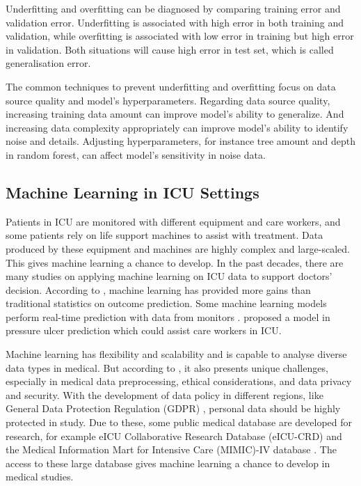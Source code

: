 \documentclass[12pt,a4paper,english
]{tunithesis}
\begin{document}
Underfitting and overfitting can be diagnosed by comparing training error and validation error. Underfitting is associated with high error in both training and validation, while overfitting is associated with low error in training but high error in validation. Both situations will cause high error in test set, which is called generalisation error. 

The common techniques to prevent underfitting and overfitting focus on data source quality and model's hyperparameters. Regarding data source quality, increasing training data amount can improve model's ability to generalize. And increasing data complexity appropriately can improve model's ability to identify noise and details. Adjusting hyperparameters, for instance tree amount and depth in random forest, can affect model's sensitivity in noise data. 

\subsection{Machine Learning in ICU Settings}
Patients in ICU are monitored with different equipment and care workers, and some patients rely on life support machines to assist with treatment. Data produced by these equipment and machines are highly complex and large-scaled. This gives machine learning a chance to develop. In the past decades, there are many studies on applying machine learning on ICU data to support doctors' decision. According to \textcite{Kim2011}, machine learning has provided more gains than traditional statistics on outcome prediction. Some machine learning models perform real-time prediction with data from monitors \parencite{mitdavid2020, Zhale2021}. \textcite{sin2022} proposed a model in pressure ulcer prediction which could assist care workers in ICU. 

Machine learning has flexibility and scalability and is capable to analyse diverse data types in medical. But according to \textcite{ngiam2019}, it also presents unique challenges, especially in medical data preprocessing, ethical considerations, and data privacy and security. With the development of data policy in different regions, like General Data Protection Regulation (GDPR) \parencite{GDPR2016}, personal data should be highly protected in study. Due to these, some public medical database are developed for research, for example eICU Collaborative Research Database (eICU-CRD) \parencite{Pollard2018} and the Medical Information Mart for Intensive Care (MIMIC)-IV database \parencite{johnson2023}. The access to these large database gives machine learning a chance to develop in medical studies.
\end{document}
